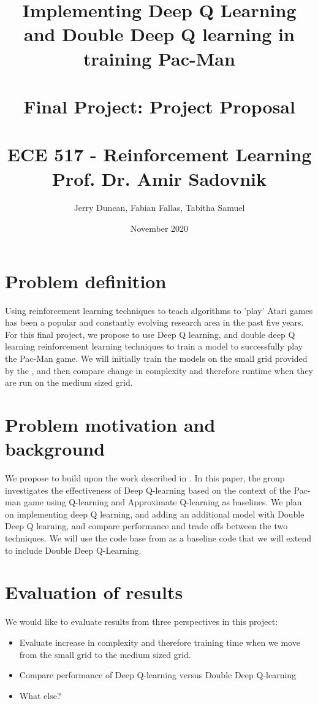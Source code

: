 \documentclass[titlepage]{article}
\title{Implementing Deep Q Learning and Double Deep Q learning in training Pac-Man \\ 
\ \\
\large {Final Project: Project Proposal}\\
\ \\
ECE 517 - Reinforcement Learning \\
Prof. Dr. Amir Sadovnik
}
\author{Jerry Duncan, Fabian Fallas, Tabitha Samuel }
\date{November 2020}
\begin{document}
\maketitle
\section{Problem definition}
Using reinforcement learning techniques to teach algorithms to 'play' Atari games has been a popular and constantly evolving research area in the past five years. For this final project, we propose to use Deep Q learning, and double deep Q learning reinforcement learning techniques to train a model to successfully play the Pac-Man game. We will initially train the models on the small grid provided by the \cite{openaigym} , and then compare change in complexity and therefore runtime when they are run on the medium sized grid. 

\section{Problem motivation and background}
We propose to build upon the work described in \cite{gnanasekaranreinforcement}. In this paper, the group investigates the effectiveness of Deep Q-learning based on the context of the Pac-man game using Q-learning and Approximate Q-learning as baselines. We plan on implementing deep Q learning, and adding an additional model with Double Deep Q learning, and compare performance and trade offs between the two techniques. We will use the code base from \cite{pacmandqn} as a baseline code that we will extend to include Double Deep Q-Learning.

\section{Evaluation of results}
We would like to evaluate results from three perspectives in this project:
\begin{itemize}
\item Evaluate increase in complexity and therefore training time when we  move from the small grid to the medium sized grid.
\item Compare performance of Deep Q-learning versus Double Deep Q-learning
\item What else?
\end{itemize}



\end{document}

